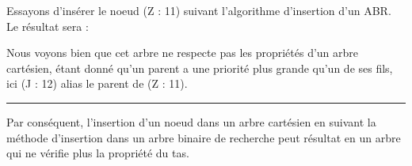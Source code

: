 \documentclass[a4paper,12pt]{report}
\begin{document}
\begin{tcolorbox}[colback=gray!10, colframe=blue!30, coltitle=black, title=Réponse à la 3.a - 2/2]

    Essayons d'insérer le noeud (Z : 11) suivant l'algorithme d'insertion d'un ABR. Le résultat sera :\\

    \begin{center}
    \end{center}

    \vspace{0.5cm}

    Nous voyons bien que cet arbre ne respecte pas les propriétés d'un arbre cartésien, étant donné qu'un parent a une priorité plus grande qu'un de ses fils, ici (J : 12) alias le parent de (Z : 11).

    \vspace{0.5cm}
    \hrule
    \vspace{0.5cm}

    Par conséquent, l'insertion d'un noeud dans un arbre cartésien en suivant la méthode d'insertion dans un arbre binaire de recherche peut résultat en un arbre qui ne vérifie plus la propriété du tas.

\end{tcolorbox}
\end{document}
